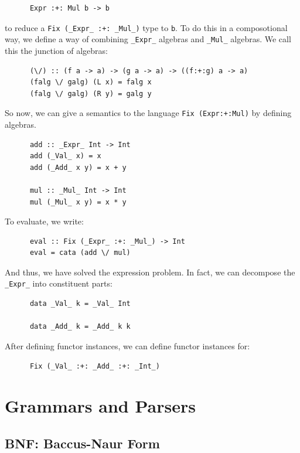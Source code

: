 \documentclass[a4paper,12pt]{article}
\theoremstyle{remark}
\begin{document}
  \begin{lstlisting}
      Expr :+: Mul b -> b  \end{lstlisting}

  to reduce a \lstinline{Fix (_Expr_ :+: _Mul_)} type to  \lstinline{b}. To do this in a composotional way,
  we define a way of combining \lstinline{_Expr_} algebras and \lstinline{_Mul_} algebras. We call this the
  junction of algebras:

  \begin{lstlisting}
      (\/) :: (f a -> a) -> (g a -> a) -> ((f:+:g) a -> a)
      (falg \/ galg) (L x) = falg x
      (falg \/ galg) (R y) = galg y  \end{lstlisting}

  So now, we can give a semantics to the language \lstinline{Fix (Expr:+:Mul)} by defining algebras.

  \begin{lstlisting}
      add :: _Expr_ Int -> Int
      add (_Val_ x) = x
      add (_Add_ x y) = x + y

      mul :: _Mul_ Int -> Int
      mul (_Mul_ x y) = x * y  \end{lstlisting}

  To evaluate, we write:

  \begin{lstlisting}
      eval :: Fix (_Expr_ :+: _Mul_) -> Int
      eval = cata (add \/ mul)  \end{lstlisting}

  And thus, we have solved the expression problem. In fact, we can decompose the \lstinline{_Expr_}
  into constituent parts:

  \begin{lstlisting}
      data _Val_ k = _Val_ Int

      data _Add_ k = _Add_ k k  \end{lstlisting}

  After defining functor instances, we can define functor instances for:

  \begin{lstlisting}
      Fix (_Val_ :+: _Add_ :+: _Int_)  \end{lstlisting}

  \section{Grammars and Parsers}

  \subsection{BNF: Baccus-Naur Form}
\end{document}
